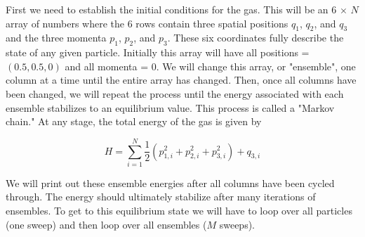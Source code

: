 \documentclass[11pt]{amsart}
\begin{document}
\vspace{3 mm}

First we need to establish the initial conditions for the gas.  This will be an 6 $\times$ $N$ array of numbers where the 6 rows contain three spatial positions $q_1$, $q_2$, and $q_3$ and the three momenta $p_1$, $p_2$, and $p_3$.  These six coordinates fully describe the state of any given particle.  Initially this array will have all positions = $(0.5,0.5,0)$ and all momenta = 0.  We will change this array, or "ensemble", one column at a time until the entire array has changed.  Then, once all columns have been changed, we will repeat the process until the energy associated with each ensemble stabilizes to an equilibrium value.  This process is called a "Markov chain."  At any stage, the total energy of the gas is given by

\begin{equation}
H = \sum\limits_{i=1}^N \frac{1}{2} (p_{1,i}^2+p_{2,i}^2+p_{3,i}^2) + q_{3,i}
\end{equation}
\vspace{2 mm}

We will print out these ensemble energies after all columns have been cycled through.  The energy should ultimately stabilize after many iterations of ensembles.  To get to this equilibrium state we will have to loop over all particles (one sweep) and then loop over all ensembles ($M$ sweeps).
\vspace{2 mm}
\end{document}

